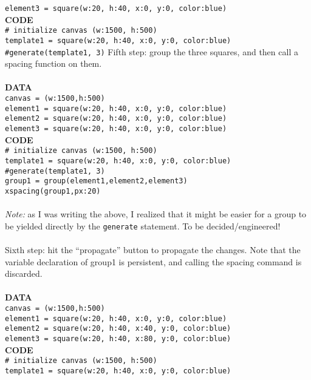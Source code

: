 \documentclass[12pt]{article}
\theoremstyle{remark}
\newcommand{\ttt}[1]{\texttt{#1}}
\begin{document}
\begin{section}
\ttt{element3 = square(w:20, h:40, x:0, y:0, color:blue)}\\
\textbf{CODE}\\
\ttt{\# initialize canvas (w:1500, h:500)}\\
\ttt{template1 = square(w:20, h:40, x:0, y:0, color:blue)}\\
\ttt{\#generate(template1, 3)}
\newpage
\noindent Fifth step: group the three squares, and then call a spacing function on them.
\\\\
\textbf{DATA}\\
\ttt{canvas = (w:1500,h:500)}
\\
\ttt{element1 = square(w:20, h:40, x:0, y:0, color:blue)}
\\
\ttt{element2 = square(w:20, h:40, x:0, y:0, color:blue)}\\
\ttt{element3 = square(w:20, h:40, x:0, y:0, color:blue)}\\
\textbf{CODE}\\
\ttt{\# initialize canvas (w:1500, h:500)}\\
\ttt{template1 = square(w:20, h:40, x:0, y:0, color:blue)}\\
\ttt{\#generate(template1, 3)}\\
\ttt{group1 = group(element1,element2,element3)}\\
\ttt{xspacing(group1,px:20)}
\\\\
\textit{Note:} as I was writing the above, I realized that it might be easier for a group to be yielded directly by the \ttt{generate} statement. To be decided/engineered!
\\\\
Sixth step: hit the ``propagate'' button to propagate the changes. Note that the variable declaration of group1 is persistent, and calling the spacing command is discarded.
\\\\
\textbf{DATA}\\
\ttt{canvas = (w:1500,h:500)}
\\
\ttt{element1 = square(w:20, h:40, x:0, y:0, color:blue)}
\\
\ttt{element2 = square(w:20, h:40, x:40, y:0, color:blue)}\\
\ttt{element3 = square(w:20, h:40, x:80, y:0, color:blue)}\\
\textbf{CODE}\\
\ttt{\# initialize canvas (w:1500, h:500)}\\
\ttt{template1 = square(w:20, h:40, x:0, y:0, color:blue)}\\

\end{section}
\end{document}
